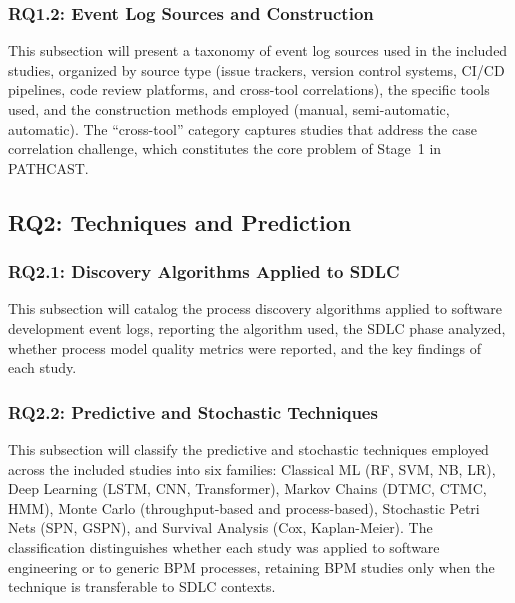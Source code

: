 \subsubsection{RQ1.2: Event Log Sources and Construction}


This subsection will present a taxonomy of event log sources used in the included studies, organized by source type (issue trackers, version control systems, CI/CD pipelines, code review platforms, and cross-tool correlations), the specific tools used, and the construction methods employed (manual, semi-automatic, automatic). The ``cross-tool'' category captures studies that address the case correlation challenge, which constitutes the core problem of Stage~1 in PATHCAST.


\subsection{RQ2: Techniques and Prediction}
\label{sec:slr-rq2}

\subsubsection{RQ2.1: Discovery Algorithms Applied to SDLC}


This subsection will catalog the process discovery algorithms applied to software development event logs, reporting the algorithm used, the SDLC phase analyzed, whether process model quality metrics were reported, and the key findings of each study.

\subsubsection{RQ2.2: Predictive and Stochastic Techniques}


This subsection will classify the predictive and stochastic techniques employed across the included studies into six families: Classical ML (RF, SVM, NB, LR), Deep Learning (LSTM, CNN, Transformer), Markov Chains (DTMC, CTMC, HMM), Monte Carlo (throughput-based and process-based), Stochastic Petri Nets (SPN, GSPN), and Survival Analysis (Cox, Kaplan-Meier). The classification distinguishes whether each study was applied to software engineering or to generic BPM processes, retaining BPM studies only when the technique is transferable to SDLC contexts.


